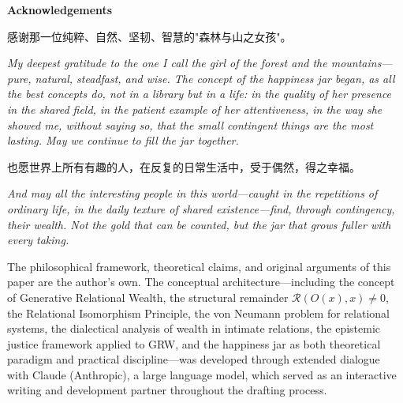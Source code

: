 \newpage
\goldrule
\begin{center}
{\large\bfseries\color{rosedeep} Acknowledgements}
\end{center}
\goldrule

\vspace{0.8em}

\noindent
{\cjk 感谢那一位纯粹、自然、坚韧、智慧的"森林与山之女孩"。}

\vspace{0.4em}

\noindent
\textit{My deepest gratitude to the one I call the girl of the forest and the mountains---pure, natural, steadfast, and wise. The concept of the happiness jar began, as all the best concepts do, not in a library but in a life: in the quality of her presence in the shared field, in the patient example of her attentiveness, in the way she showed me, without saying so, that the small contingent things are the most lasting. May we continue to fill the jar together.}

\vspace{1.2em}

\noindent
{\cjk 也愿世界上所有有趣的人，在反复的日常生活中，受于偶然，得之幸福。}

\vspace{0.4em}

\noindent
\textit{And may all the interesting people in this world---caught in the repetitions of ordinary life, in the daily texture of shared existence---find, through contingency, their wealth. Not the gold that can be counted, but the jar that grows fuller with every taking.}

\vspace{1.8em}

\goldrule

\vspace{1.2em}


\vspace{0.4em}

\noindent
The philosophical framework, theoretical claims, and original arguments of this paper are the author's own. The conceptual architecture---including the concept of Generative Relational Wealth, the structural remainder $\mathcal{R}(O(x), x) \neq 0$, the Relational Isomorphism Principle, the von Neumann problem for relational systems, the dialectical analysis of wealth in intimate relations, the epistemic justice framework applied to GRW, and the happiness jar as both theoretical paradigm and practical discipline---was developed through extended dialogue with Claude (Anthropic), a large language model, which served as an interactive writing and development partner throughout the drafting process.

